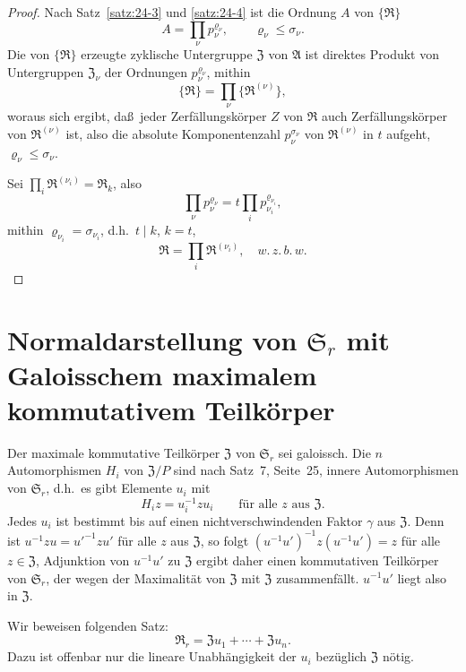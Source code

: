 \documentclass[12pt,a4paper]{article}
\theoremstyle{plain}
\theoremstyle{definition}
\theoremstyle{remark}
\newcommand{\wzbw}{w.\,z.\,b.\,w.}
\begin{document}
\begin{proof}
Nach Satz~\ref{satz:24-3} und \ref{satz:24-4} ist die Ordnung $A$ von $\{\mathfrak{R}\}$
\[
A = \prod_{\nu} p_{\nu}^{\varrho_{\nu}}, \qquad \varrho_{\nu} \leq \sigma_{\nu}.
\]
Die von $\{\mathfrak{R}\}$ erzeugte zyklische Untergruppe $\mathfrak{Z}$ von $\mathfrak{A}$ ist direktes
Produkt von Untergruppen $\mathfrak{Z}_{\nu}$ der Ordnungen $p_{\nu}^{\varrho_{\nu}}$, mithin
\[
\{\mathfrak{R}\} = \prod_{\nu}\{\mathfrak{R}^{(\nu)}\},
\]%
woraus sich ergibt, da\ss\ jeder Zerf\"allungsk\"orper $Z$ von $\mathfrak{R}$ auch
Zerf\"allungsk\"orper von $\mathfrak{R}^{(\nu)}$ ist, also die absolute Komponentenzahl
$p_{\nu}^{\sigma_{\nu}}$ von $\mathfrak{R}^{(\nu)}$ in $t$ aufgeht, $\varrho_{\nu} \leq \sigma_{\nu}$.

Sei $\prod_{i}\mathfrak{R}^{(\nu_{i})} = \mathfrak{R}_{k}$, also
\[
\prod_{\nu}p_{\nu}^{\varrho_{\nu}} = t\prod_{i}p_{\nu_{i}}^{\varrho_{\nu_{i}}},
\]
mithin $\varrho_{\nu_{i}} = \sigma_{\nu_{i}}$, d.h.\ $t \mid k$, $k = t$,
\[
\mathfrak{R} = \prod_{i}\mathfrak{R}^{(\nu_{i})}, \quad \wzbw
\]
\qedhere
\end{proof}


\newpage
\section{Normaldarstellung von $\mathfrak{S}_{r}$ mit Galoisschem maximalem kommutativem Teilk\"orper}\label{sec:25}

Der maximale kommutative Teilk\"orper $\mathfrak{Z}$ von $\mathfrak{S}_{r}$ sei galoissch. Die $n$
Automorphismen $H_{i}$ von $\mathfrak{Z}/P$ sind nach Satz~7, Seite~25, innere
Automorphismen von $\mathfrak{S}_{r}$, d.h.\ es gibt Elemente $u_{i}$ mit
\[
H_{i}z = u_{i}^{-1}zu_{i} \qquad \text{f\"ur alle } z \text{ aus } \mathfrak{Z}.
\]
Jedes $u_{i}$ ist bestimmt bis auf einen nichtverschwindenden Faktor
$\gamma$ aus $\mathfrak{Z}$. Denn ist $u^{-1}zu = u'^{-1}zu'$ f\"ur alle $z$ aus $\mathfrak{Z}$, so folgt
$(u^{-1}u')^{-1}z(u^{-1}u') = z$ f\"ur alle $z \in \mathfrak{Z}$, Adjunktion von $u^{-1}u'$ zu
$\mathfrak{Z}$ ergibt daher einen kommutativen Teilk\"orper von $\mathfrak{S}_{r}$, der wegen der
Maximalit\"at von $\mathfrak{Z}$ mit $\mathfrak{Z}$ zusammenf\"allt. $u^{-1}u'$ liegt also in $\mathfrak{Z}$.

Wir beweisen folgenden Satz:
\[
\mathfrak{R}_{r} = \mathfrak{Z}u_{1} + \cdots + \mathfrak{Z}u_{n}.
\]
Dazu ist offenbar nur die lineare Unabh\"angigkeit der $u_{i}$ bez\"uglich $\mathfrak{Z}$
n\"otig.
\end{document}
